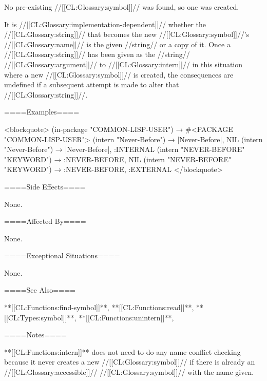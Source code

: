 
No pre-existing //[[CL:Glossary:symbol]]// was found, so one was created.

It is //[[CL:Glossary:implementation-dependent]]// whether the //[[CL:Glossary:string]]// that becomes the new //[[CL:Glossary:symbol]]//'s //[[CL:Glossary:name]]// is the given //string// or a copy of it. Once a //[[CL:Glossary:string]]// has been given as the //string// //[[CL:Glossary:argument]]// to //[[CL:Glossary:intern]]// in this situation where a new //[[CL:Glossary:symbol]]// is created, the consequences are undefined if a subsequent attempt is made to alter that //[[CL:Glossary:string]]//.

\endlist

====Examples====

<blockquote> (in-package "COMMON-LISP-USER") → #<PACKAGE "COMMON-LISP-USER"> (intern "Never-Before") → |Never-Before|, NIL (intern "Never-Before") → |Never-Before|, :INTERNAL (intern "NEVER-BEFORE" "KEYWORD") → :NEVER-BEFORE, NIL (intern "NEVER-BEFORE" "KEYWORD") → :NEVER-BEFORE, :EXTERNAL </blockquote>

====Side Effects====

None.

====Affected By====

None.

====Exceptional Situations====

None.

====See Also====

**[[CL:Functions:find-symbol]]**, **[[CL:Functions:read]]**, **[[CL:Types:symbol]]**, **[[CL:Functions:unintern]]**, {\secref\SymbolTokens}

====Notes====

**[[CL:Functions:intern]]** does not need to do any name conflict checking because it never creates a new //[[CL:Glossary:symbol]]// if there is already an //[[CL:Glossary:accessible]]// //[[CL:Glossary:symbol]]// with the name given.

 
